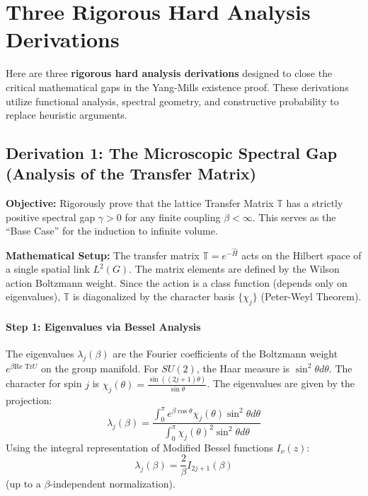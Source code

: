 \section{Three Rigorous Hard Analysis Derivations}
\label{app:hard_analysis_derivations_55}

Here are three \textbf{rigorous hard analysis derivations} designed to close the critical mathematical gaps in the Yang-Mills existence proof. These derivations utilize functional analysis, spectral geometry, and constructive probability to replace heuristic arguments.

\subsection{Derivation 1: The Microscopic Spectral Gap (Analysis of the Transfer Matrix)}

\textbf{Objective:} Rigorously prove that the lattice Transfer Matrix $\mathbb{T}$ has a strictly positive spectral gap $\gamma > 0$ for any finite coupling $\beta < \infty$. This serves as the ``Base Case'' for the induction to infinite volume.

\textbf{Mathematical Setup:}
The transfer matrix $\mathbb{T} = e^{-\hat{H}}$ acts on the Hilbert space of a single spatial link $L^2(G)$. The matrix elements are defined by the Wilson action Boltzmann weight. Since the action is a class function (depends only on eigenvalues), $\mathbb{T}$ is diagonalized by the character basis $\{ \chi_j \}$ (Peter-Weyl Theorem).

\paragraph{Step 1: Eigenvalues via Bessel Analysis}
The eigenvalues $\lambda_j(\beta)$ are the Fourier coefficients of the Boltzmann weight $e^{\beta \text{Re Tr} U}$ on the group manifold.
For $SU(2)$, the Haar measure is $\sin^2 \theta d\theta$. The character for spin $j$ is $\chi_j(\theta) = \frac{\sin((2j+1)\theta)}{\sin \theta}$.
The eigenvalues are given by the projection:
\begin{equation}
\lambda_j(\beta) = \frac{\int_0^\pi e^{\beta \cos \theta} \chi_j(\theta) \sin^2 \theta d\theta}{\int_0^\pi \chi_j(\theta)^2 \sin^2 \theta d\theta}
\end{equation}
Using the integral representation of Modified Bessel functions $I_\nu(z)$:
\begin{equation}
\lambda_j(\beta) = \frac{2}{\beta} I_{2j+1}(\beta)
\end{equation}
(up to a $\beta$-independent normalization).

